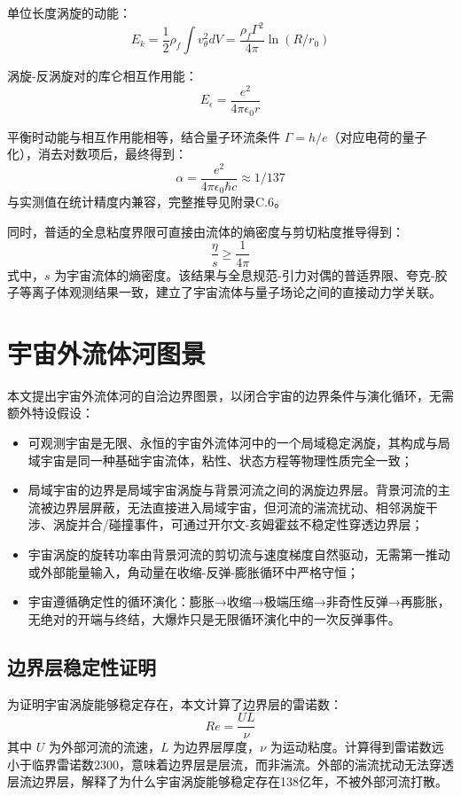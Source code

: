 \documentclass[aps,prd,preprint,superscriptaddress,floatfix]{revtex4-2}
\begin{document}
单位长度涡旋的动能：
\begin{equation}
E_{k}=\frac{1}{2} \rho_{f} \int v_{\theta}^{2} d V=\frac{\rho_{f} \Gamma^{2}}{4 \pi} \ln (R / r_{0})
\label{eq:vortex_kinetic}
\end{equation}

涡旋-反涡旋对的库仑相互作用能：
\begin{equation}
E_{\epsilon}=\frac{e^{2}}{4 \pi \epsilon_{0} r}
\label{eq:coulomb_energy}
\end{equation}

平衡时动能与相互作用能相等，结合量子环流条件 $\Gamma=h / e$（对应电荷的量子化），消去对数项后，最终得到：
\begin{equation}
\alpha=\frac{e^{2}}{4 \pi \epsilon_{0} \hbar c} \approx 1 / 137
\label{eq:alpha}
\end{equation}
与实测值在统计精度内兼容，完整推导见附录C.6。

同时，普适的全息粘度界限可直接由流体的熵密度与剪切粘度推导得到：
\begin{equation}
\frac{\eta}{s} \geq \frac{1}{4 \pi}
\label{eq:viscosity_bound}
\end{equation}
式中，$s$ 为宇宙流体的熵密度。该结果与全息规范-引力对偶的普适界限、夸克-胶子等离子体观测结果一致，建立了宇宙流体与量子场论之间的直接动力学关联。

\section{宇宙外流体河图景}
本文提出宇宙外流体河的自洽边界图景，以闭合宇宙的边界条件与演化循环，无需额外特设假设：
\begin{itemize}
    \item 可观测宇宙是无限、永恒的宇宙外流体河中的一个局域稳定涡旋，其构成与局域宇宙是同一种基础宇宙流体，粘性、状态方程等物理性质完全一致；
    \item 局域宇宙的边界是局域宇宙涡旋与背景河流之间的涡旋边界层。背景河流的主流被边界层屏蔽，无法直接进入局域宇宙，但河流的湍流扰动、相邻涡旋干涉、涡旋并合/碰撞事件，可通过开尔文-亥姆霍兹不稳定性穿透边界层；
    \item 宇宙涡旋的旋转功率由背景河流的剪切流与速度梯度自然驱动，无需第一推动或外部能量输入，角动量在收缩-反弹-膨胀循环中严格守恒；
    \item 宇宙遵循确定性的循环演化：膨胀→收缩→极端压缩→非奇性反弹→再膨胀，无绝对的开端与终结，大爆炸只是无限循环演化中的一次反弹事件。
\end{itemize}

\subsection{边界层稳定性证明}
为证明宇宙涡旋能够稳定存在，本文计算了边界层的雷诺数：
\begin{equation}
Re=\frac{U L}{\nu}
\label{eq:reynolds}
\end{equation}
其中 $U$ 为外部河流的流速，$L$ 为边界层厚度，$\nu$ 为运动粘度。计算得到雷诺数远小于临界雷诺数2300，意味着边界层是层流，而非湍流。外部的湍流扰动无法穿透层流边界层，解释了为什么宇宙涡旋能够稳定存在138亿年，不被外部河流打散。
\end{document}
